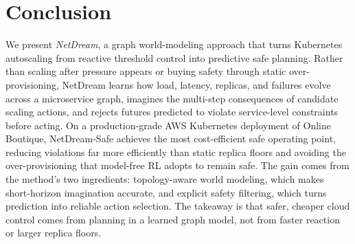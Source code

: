 \section{Conclusion}

We present \emph{NetDream}, a graph world-modeling approach that turns Kubernetes autoscaling from reactive threshold control into predictive safe planning. Rather than scaling after pressure appears or buying safety through static over-provisioning, NetDream learns how load, latency, replicas, and failures evolve across a microservice graph, imagines the multi-step consequences of candidate scaling actions, and rejects futures predicted to violate service-level constraints before acting. On a production-grade AWS Kubernetes deployment of Online Boutique, NetDream-Safe achieves the most cost-efficient safe operating point, reducing violations far more efficiently than static replica floors and avoiding the over-provisioning that model-free RL adopts to remain safe. The gain comes from the method's two ingredients: topology-aware world modeling, which makes short-horizon imagination accurate, and explicit safety filtering, which turns prediction into reliable action selection. The takeaway is that safer, cheaper cloud control comes from planning in a learned graph model, not from faster reaction or larger replica floors.